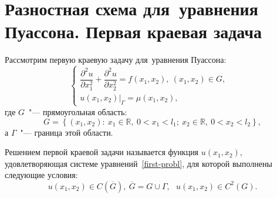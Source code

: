\documentclass[11pt,a4paper,twoside]{report}
\numberwithin{equation}{section}
\theoremstyle{definition}
\theoremstyle{plain}
\begin{document}
%
\section{Разностная схема для~уравнения Пуассона. Первая краевая задача}
%
\label{paragraph-6-ref}
Рассмотрим первую краевую задачу для~уравнения Пуассона:
%
\begin{equation}
    \label{first-probl}
    \begin{cases}
        \dfrac{\partial^2u}{\partial x_1^2} + \dfrac{\partial^2u}{\partial x_2^2}
            = f(x_1, x_2),~(x_1, x_2) \in G,\\[.2em]
        \left.u(x_1, x_2)\right\vert_{\Gamma} = \mu(x_1, x_2), &
    \end{cases}
\end{equation}
%
где $G$~"--- прямоугольная область:
%
$$
    G = \left\{(x_1, x_2)\colon~x_1 \in \mathbb{R},~0 < x_1 < l_1;
    ~x_2\in\mathbb{R},~0 < x_2 < l_2\right\},
$$
%
а $\Gamma$~"--- граница этой области.

Решением первой краевой задачи называется функция $u(x_1,x_2)$, удовлетворяющая
системе уравнений~\eqref{first-probl}, для которой выполнены следующие условия:
%
$$
    u(x_1,x_2)\in C\left(\overline{G}\right),~\overline{G} = G\cup\Gamma,~~~
    u(x_1,x_2) \in C^{2}(G).
$$
%
\end{document}
